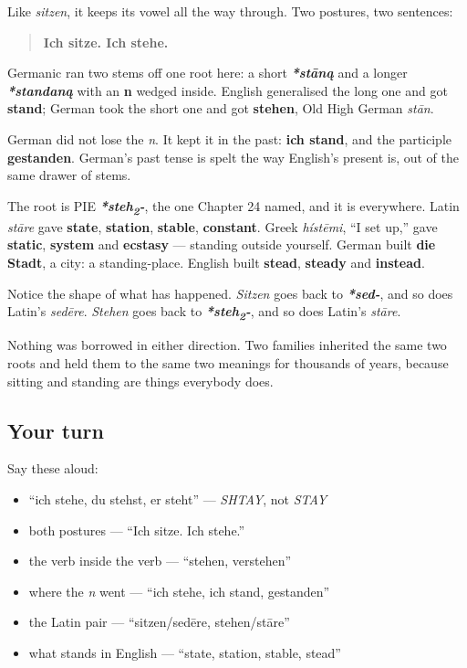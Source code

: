 Like \emph{sitzen}, it keeps its vowel all the way through. Two postures, two sentences:

\begin{quote}
\textbf{Ich sitze. Ich stehe.}
\end{quote}

\begin{cousinweb}
Germanic ran two stems off one root here: a short \emph{\textbf{*stāną}} and a longer \emph{\textbf{*standaną}} with an \textbf{n} wedged inside. English generalised the long one and got \textbf{stand}; German took the short one and got \textbf{stehen}, Old High German \emph{stān}.

German did not lose the \emph{n}. It kept it in the past: \textbf{ich stand}, and the participle \textbf{gestanden}. German's past tense is spelt the way English's present is, out of the same drawer of stems.

The root is PIE \emph{\textbf{*steh\textsubscript{2}-}}, the one Chapter 24 named, and it is everywhere. Latin \emph{stāre} gave \textbf{state}, \textbf{station}, \textbf{stable}, \textbf{constant}. Greek \emph{hístēmi}, \textquotedblleft{}I set up,\textquotedblright{} gave \textbf{static}, \textbf{system} and \textbf{ecstasy} — standing outside yourself. German built \textbf{die Stadt}, a city: a standing-place. English built \textbf{stead}, \textbf{steady} and \textbf{instead}.
\end{cousinweb}

\begin{culture}
Notice the shape of what has happened. \emph{Sitzen} goes back to \emph{\textbf{*sed-}}, and so does Latin's \emph{sedēre}. \emph{Stehen} goes back to \emph{\textbf{*steh\textsubscript{2}-}}, and so does Latin's \emph{stāre}.

Nothing was borrowed in either direction. Two families inherited the same two roots and held them to the same two meanings for thousands of years, because sitting and standing are things everybody does.
\end{culture}

\subsection*{Your turn}
Say these aloud:

\begin{itemize}
\raggedright
  \item \textquotedblleft{}ich stehe, du stehst, er steht\textquotedblright{} — \emph{SHTAY}, not \emph{STAY}
  \item both postures — \textquotedblleft{}Ich sitze. Ich stehe.\textquotedblright{}
  \item the verb inside the verb — \textquotedblleft{}stehen, verstehen\textquotedblright{}
  \item where the \emph{n} went — \textquotedblleft{}ich stehe, ich stand, gestanden\textquotedblright{}
  \item the Latin pair — \textquotedblleft{}sitzen/sedēre, stehen/stāre\textquotedblright{}
  \item what stands in English — \textquotedblleft{}state, station, stable, stead\textquotedblright{}
\end{itemize}

